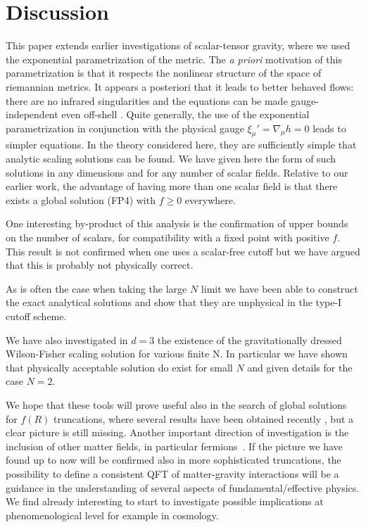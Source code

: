 \documentclass[a4paper,11pt]{revtex4}
\begin{document}
\section{Discussion}

This paper extends earlier investigations of scalar-tensor
gravity, where we used the exponential parametrization of the metric.
The {\it a priori} motivation of this parametrization is that
it respects the nonlinear structure of the space of riemannian metrics.
It appears a posteriori that it leads to better behaved flows:
there are no infrared singularities \cite{pv1,falls}
and the equations can be made gauge-independent even off-shell
\cite{falls}.
Quite generally, the use of the exponential parametrization
in conjunction with the physical gauge $\xi_\mu'=\nabla_\mu h=0$
leads to simpler equations.
In the theory considered here, they are sufficiently simple
that analytic scaling solutions can be found.
We have given here the form of such solutions in any dimensions
and for any number of scalar fields.
Relative to our earlier work, the advantage of having more than
one scalar field is that there exists a global solution (FP4)
with $f\geq 0$ everywhere.

One interesting by-product of this analysis is the confirmation
of upper bounds on the number of scalars, for compatibility with
a fixed point with positive $f$.
This result is not confirmed when one uses a scalar-free cutoff
but we have argued that this is probably not physically correct.

As is often the case when taking the large $N$ limit we have been able to construct the exact analytical solutions
and show that they are unphysical in the type-I cutoff scheme.

We have also investigated in $d=3$ the existence of the gravitationally dressed Wilson-Fisher scaling solution for various finite N.
In particular we have shown that physically acceptable solution do exist for small $N$ and given details for the case $N=2$. 

We hope that these tools will prove useful also in the search
of global solutions for $f(R)$ truncations,
where several results have been obtained recently
\cite{various}, but a clear picture is still missing.
Another important direction of investigation is the inclusion of other matter fields, in particular fermions~\cite{Yuk,EG,VZ}.
If the picture we have found up to now will be confirmed also in more sophisticated truncations,
the possibility to define a consistent QFT of matter-gravity interactions will be a guidance in the understanding of several aspects of fundamental/effective physics.
We find already interesting to start to investigate possible implications at phenomenological level for example in cosmology. 
\end{document}
